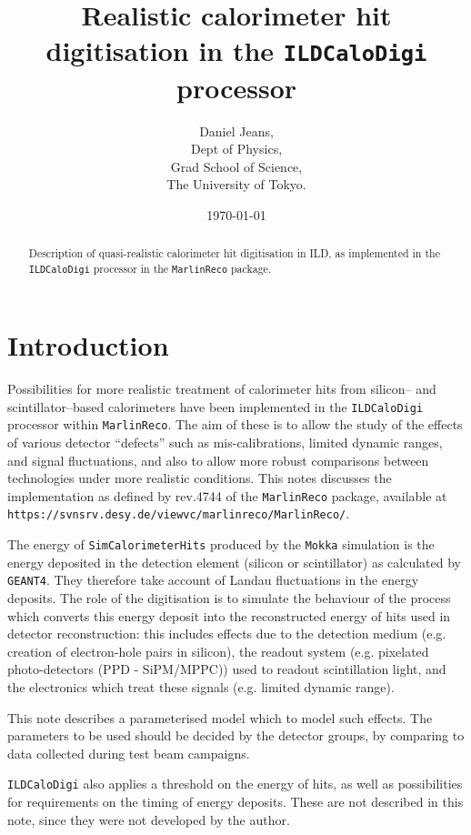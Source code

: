 \documentclass[12pt]{article} %
\title{Realistic calorimeter hit digitisation in the {\tt ILDCaloDigi} processor}
\author{Daniel Jeans, \\ 
Dept of Physics, \\
Grad School of Science, \\
The University of Tokyo.}
\date{\today}
\begin{document}
\maketitle

\begin{abstract}

Description of quasi-realistic calorimeter hit digitisation in ILD, as implemented in
the {\tt ILDCaloDigi} processor in the {\tt MarlinReco} package.

\end{abstract}


\section{Introduction}

Possibilities for more realistic treatment of calorimeter hits from silicon-- and scintillator--based calorimeters have been 
implemented in the {\tt ILDCaloDigi} processor within {\tt MarlinReco}. The aim of these is to allow the study of the effects 
of various detector ``defects'' such as mis-calibrations, limited dynamic ranges, and signal fluctuations, 
and also to allow more robust comparisons between technologies under more realistic conditions.
This notes discusses the implementation as defined by rev.4744 of the {\tt MarlinReco} package, available at
{\tt https://svnsrv.desy.de/viewvc/marlinreco/MarlinReco/}.

The energy of {\tt SimCalorimeterHits} produced by the {\tt Mokka} simulation is the energy deposited in the detection
element (silicon or scintillator) as calculated by {\tt GEANT4}. They therefore take account of Landau fluctuations
in the energy deposits.
The role of the digitisation is to simulate the behaviour of the process which converts this energy deposit into the 
reconstructed energy of hits used in detector reconstruction: this includes effects due to the detection medium
(e.g. creation of electron-hole pairs in silicon), 
the readout system (e.g. pixelated photo-detectors (PPD - SiPM/MPPC)) used to readout scintillation light,
and the electronics which treat these signals (e.g. limited dynamic range).

This note describes a parameterised model which to model such effects. The parameters to be used should be decided by
the detector groups, by comparing to data collected during test beam campaigns.

{\tt ILDCaloDigi} also applies a threshold on the energy of hits, as well as possibilities for requirements on the timing
of energy deposits. These are not described in this note, since they were not developed by the author.
\end{document}
